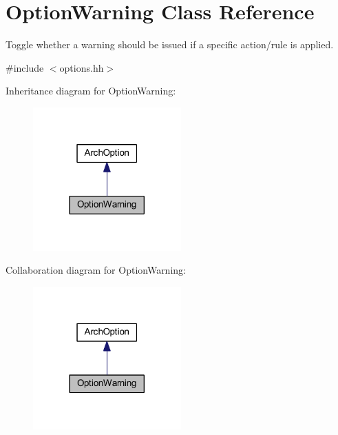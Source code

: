 \hypertarget{class_option_warning}{}\section{Option\+Warning Class Reference}
\label{class_option_warning}


Toggle whether a warning should be issued if a specific action/rule is applied.  




{\ttfamily \#include $<$options.\+hh$>$}



Inheritance diagram for Option\+Warning\+:
\nopagebreak
\begin{figure}[H]
\begin{center}
\leavevmode
\includegraphics[width=161pt]{class_option_warning__inherit__graph}
\end{center}
\end{figure}


Collaboration diagram for Option\+Warning\+:
\nopagebreak
\begin{figure}[H]
\begin{center}
\leavevmode
\includegraphics[width=161pt]{class_option_warning__coll__graph}
\end{center}
\end{figure}
